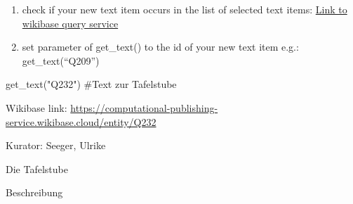 \documentclass[
  letterpaper,
]{book}
\newenvironment{Shaded}{\begin{snugshade}}{\end{snugshade}}
\newcommand{\CommentTok}[1]{\textcolor[rgb]{0.37,0.37,0.37}{#1}}
\newcommand{\NormalTok}[1]{\textcolor[rgb]{0.00,0.23,0.31}{#1}}
\newcommand{\StringTok}[1]{\textcolor[rgb]{0.13,0.47,0.30}{#1}}
\begin{document}
\begin{enumerate}
\def\labelenumi{\arabic{enumi}.}
\setcounter{enumi}{1}
\item
  check if your new text item occurs in the list of selected text items:
  \href{https://computational-publishing-service.wikibase.cloud/query/\#PREFIX\%20cps\%3A\%20\%3Chttps\%3A\%2F\%2Fcomputational-publishing-service.wikibase.cloud\%2Fentity\%2F\%3E\%0APREFIX\%20cpss\%3A\%20\%3Chttps\%3A\%2F\%2Fcomputational-publishing-service.wikibase.cloud\%2Fentity\%2Fstatement\%2F\%3E\%0APREFIX\%20cpsv\%3A\%20\%3Chttps\%3A\%2F\%2Fcomputational-publishing-service.wikibase.cloud\%2Fvalue\%2F\%3E\%0APREFIX\%20cpspt\%3A\%20\%3Chttps\%3A\%2F\%2Fcomputational-publishing-service.wikibase.cloud\%2Fprop\%2Fdirect\%2F\%3E\%0APREFIX\%20cpsp\%3A\%20\%3Chttps\%3A\%2F\%2Fcomputational-publishing-service.wikibase.cloud\%2Fprop\%2F\%3E\%0APREFIX\%20cpsps\%3A\%20\%3Chttps\%3A\%2F\%2Fcomputational-publishing-service.wikibase.cloud\%2Fprop\%2Fstatement\%2F\%3E\%0APREFIX\%20cpspq\%3A\%20\%3Chttps\%3A\%2F\%2Fcomputational-publishing-service.wikibase.cloud\%2Fprop\%2Fqualifier\%2F\%3E\%0A\%0ASELECT\%20\%3FtextItem\%20\%3FkuratorLabel\%20\%3FtextUrl\%0AWHERE\%0A\%7B\%0A\%20\%20\%3FtextItem\%20cpsp\%3AP46\%20\%3FkuratorStatement.\%20\%0A\%20\%20\%3FkuratorStatement\%20cpsps\%3AP46\%20\%3FkuratorItem.\%20\%0A\%20\%20\%3FkuratorItem\%20rdfs\%3Alabel\%20\%3FkuratorLabel.\%0A\%20\%20\%3FtextItem\%20cpsp\%3AP57\%20\%3Furlstatement.\%20\%0A\%20\%20\%3Furlstatement\%20cpsps\%3AP57\%20\%3FtextUrl.\%20\%0A\%7D}{Link
  to wikibase query service}
\item
  set parameter of get\_text() to the id of your new text item e.g.:
  get\_text(``Q209'')
\end{enumerate}

\begin{Shaded}
\begin{Highlighting}[]
\NormalTok{get\_text(}\StringTok{"Q232"}\NormalTok{)}
\CommentTok{\#Text zur Tafelstube}
\end{Highlighting}
\end{Shaded}

Wikibase link:
\url{https://computational-publishing-service.wikibase.cloud/entity/Q232}

Kurator: Seeger, Ulrike

Die Tafelstube

Beschreibung
\end{document}
